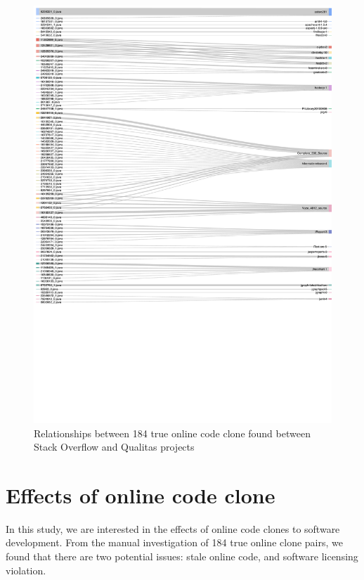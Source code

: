\documentclass{sig-alternate-05-2015}
\begin{document}
\begin{figure}
	\centering
	\includegraphics[width=1\linewidth]{Sankey_proj}
	\caption{Relationships between 184 true online code clone found between Stack Overflow and Qualitas projects}
	\label{fig:sankey}
\end{figure}


\section{Effects of online code clone}

In this study, we are interested in the effects of online code clones to software development. From the manual investigation of 184 true online clone pairs, we found that there are two potential issues: stale online code, and software licensing violation.
\end{document}
